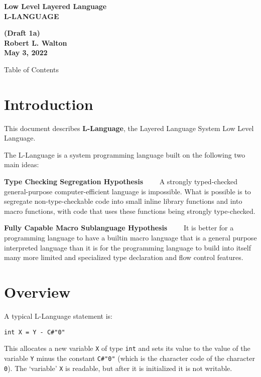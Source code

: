 \documentclass[12pt]{article}
\makeatletter
\renewcommand\tableofcontents{%
    \begin{list}{}%
	     {\setlength{\itemsep}{0in}%
	      \setlength{\topsep}{0in}%
	      \setlength{\parsep}{1ex}%
	      \setlength{\labelwidth}{0in}%
	      \setlength{\baselineskip}{1.5ex}%
	      \setlength{\leftmargin}{0.8in}%
	      \setlength{\rightmargin}{0.8in}}%
    \item\@starttoc{toc}%
    \end{list}}
\newcommand{\key}[1]{{\rm \bfseries #1}}
\newenvironment{indpar}[1][0.3in]%
	{\begin{list}{}%
		     {\setlength{\itemsep}{0in}%
		      \setlength{\topsep}{0in}%
		      \setlength{\parsep}{1ex}%
		      \setlength{\labelwidth}{#1}%
		      \setlength{\leftmargin}{#1}%
		      \addtolength{\leftmargin}{\labelsep}}%
	 \item}%
	{\end{list}}
\makeatother
\begin{document}
        
\begin{center}
\Large \bf
Low Level Layered Language\\[0.5ex]
\huge \bf
L-LANGUAGE
\end{center}
\begin{center}
\large \bf
(Draft 1a)
\\[0.5ex]
Robert L. Walton\\
May 3, 2022

\bigskip
 
Table of Contents
\end{center}

\bigskip

\tableofcontents 

\newpage

\section{Introduction}

This document describes \key{L-Language}, the Layered Language
System Low Level Language.

The L-Language is a system programming language built on the
following two main ideas:

\begin{indpar}

\key{Type Checking Segregation Hypothesis}~~~~ A strongly typed-checked
general-purpose computer-efficient language is impossible.
What is possible is
to segregate non-type-checkable code into small inline
library functions and into macro functions,
with code that uses these functions being
strongly type-checked.

\key{Fully Capable Macro Sublanguage Hypothesis}~~~~ It is better for
a programming language to have a builtin macro language that
is a general purpose interpreted language than it is for the
programming language to build into itself
many more limited and specialized type declaration and
flow control features.

\end{indpar}

\section{Overview}

A typical L-Language statement is:
\begin{indpar}\begin{verbatim}
int X = Y - C#"0"
\end{verbatim}\end{indpar}
This allocates a new variable {\tt X} of type {\tt int}
and sets its value to the value of the
variable {\tt Y} minus the constant {\tt C\#"0"} (which is
the character code of the character {\tt 0}).
The `variable' {\tt X} is readable, but after it is
initialized it is not writable.
\end{document}

